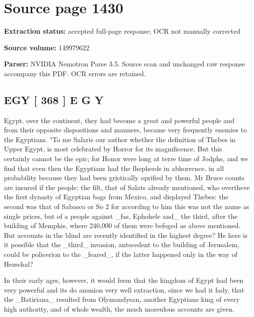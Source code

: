 \clearpage
\section{Source page 1430}
\textbf{Extraction status:} accepted full-page response; OCR not manually corrected\par
\textbf{Source volume:} 149979622\par
\textbf{Parser:} NVIDIA Nemotron Parse 3.5. Source scan and unchanged raw response accompany this PDF. OCR errors are retained.\par\medskip
\subsection*{EGY [ 368 ] E G Y}
Egypt. over the continent, they had become a great and powerful people and from their opposite dispositions and manners, became very frequently enemies to the Egyptians. "To me Salaris our author whether the definition of Thebes in Upper Egypt, is most celebrated by Horror for its magnificence. But this certainly cannot be the epic; for Honor were long at terre time of Jodphs, and we find that even then the Egyptians had the fhepherds in abhorrence, in all probability because they had been grietically oprified by them. Mr Bruce counts are insured if the people; the filt, that of Salats already mentioned, who overtheve the first dynasty of Egyptian bags from Mexico, and displayed Thebes: the second was that of Sabasco or So 2 for according to him this was not the name as single prices, but of a people against \_fas, Ephohele and\_ the third, after the building of Memphis, where 240,000 of them were befeged as above mentioned. But accounts in the blind are recently identified in the highest degree? He here is it possible that the \_third\_ invasion, antecedent to the building of Jerusalem, could be policerion to the \_feared\_, if the latter happened only in the way of Hezschal?\par\medskip
In their early ages, however, it would feem that the kingdom of Egypt had been very powerful and its do anunion very well extraction, since we had it fady, that the \_Batiriana\_ resulted from Olymandysan, another Egyptians king of every high authority, and of whole wealth, the much moreulous accounts are given.\par\medskip
